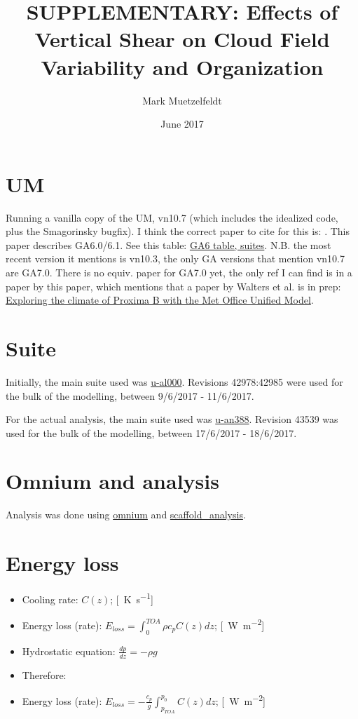 \documentclass[11pt,a4paper]{article}
\title{SUPPLEMENTARY: Effects of Vertical Shear on Cloud Field Variability and Organization }
\author{Mark Muetzelfeldt}
\date{June 2017}
\begin{document}
\maketitle

\section{UM}

Running a vanilla copy of the UM, vn10.7 (which includes the idealized code, plus the Smagorinsky bugfix). I think the correct paper to cite for this is: \cite{walters2017met}. This paper describes GA6.0/6.1. See this table: \href{https://code.metoffice.gov.uk/trac/GA/wiki/GAJobs#UMjobsforGA6.0GL6.0GC2.0}{GA6 table, suites}. N.B. the most recent version it mentions is vn10.3, the only GA versions that mention vn10.7 are GA7.0. There is no equiv. paper for GA7.0 yet, the only ref I can find is in a paper by this paper, which mentions that a paper by Walters et al. is in prep: \href{https://doi.org/10.1051/0004-6361/201630020}{Exploring the climate of Proxima B with the Met Office Unified Model}.

\section{Suite}

Initially, the main suite used was \href{https://code.metoffice.gov.uk/trac/roses-u/browser/a/l/0/0/0/trunk}{u-al000}. Revisions 42978:42985 were used for the bulk of the modelling, between 9/6/2017 - 11/6/2017.

For the actual analysis, the main suite used was \href{https://code.metoffice.gov.uk/trac/roses-u/browser/a/n/3/8/8/trunk}{u-an388}. Revision 43539 was used for the bulk of the modelling, between 17/6/2017 - 18/6/2017.

\section{Omnium and analysis}

Analysis was done using \href{https://github.com/markmuetz/omnium}{omnium} and \href{https://github.com/markmuetz/scaffold_analysis}{scaffold\_analysis}. 

\section{Energy loss}

\begin{itemize}
    \item Cooling rate: $C(z)$; [\SI{}{K.s^{-1}}]
    \item Energy loss (rate): $E_{loss} = \int_{0}^{TOA} \rho c_p C(z) dz$; [\SI{}{W.m^{-2}}]
    \item Hydrostatic equation: $\frac{dp}{dz} = - \rho g$
    \item Therefore:
    \item Energy loss (rate): $E_{loss} = - \frac{c_p}{g} \int_{p_{TOA}}^{p_0} C(z) dz$; [\SI{}{W.m^{-2}}]
\end{itemize}
\end{document}
